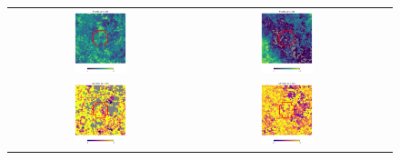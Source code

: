 \documentclass[preprintm,linenumbers]{aastex631}
\begin{document}
\begin{figure}
\begin{tabular}{  c c c}
				\includegraphics[width=0.3\textwidth]{results/skymaps_cutout/skymaps_cutout_first_year_one_snap_v4_0_10yrs_db_noDD_noTwi_tscale-14_nside-256_doAllTemplateMetrics_reduceCount_r_WFD_noDD_noTwi.pdf} &
				\includegraphics[width=0.3\textwidth]{results/skymaps_cutout/skymaps_cutout_first_year_one_snap_v4_0_10yrs_db_noDD_noTwi_tscale-14_nside-256_doAllTemplateMetrics_reduceCount_r_GP_noDD_noTwi.pdf} \\
				\includegraphics[width=0.3\textwidth]{results/skymaps_cutout/skymaps_cutout_delta_first_year_one_snap_v4_0_10yrs_db_noDD_noTwi_tscale-14_nside-256_doAllTemplateMetrics_reduceCount_r_NES_noDD_noTwi.pdf} &
				\includegraphics[width=0.3\textwidth]{results/skymaps_cutout/skymaps_cutout_delta_first_year_one_snap_v4_0_10yrs_db_noDD_noTwi_tscale-14_nside-256_doAllTemplateMetrics_reduceCount_r_WFD_noDD_noTwi.pdf} &

\end{tabular}
\end{figure}
\end{document}
